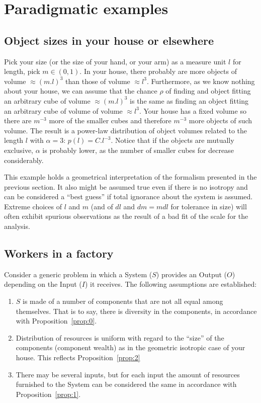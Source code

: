 \documentclass[a4paper, 11pt]{article} %
\begin{document}
\section{Paradigmatic examples}\label{sec:par}
\subsection{Object sizes in your house or elsewhere}\label{sec:siz}
Pick your size (or the size of your hand, or your arm)
as a measure unit $l$ for length, pick $m \in (0,1)$.
In your house, there probably are more objects
of volume $\approx (m.l)^3$ 
than those of volume $\approx l^3$.
Furthermore, as we know nothing about your house,
we can assume that the chance $\rho$ of finding and object
fitting an arbitrary cube of volume $\approx (m.l)^3$
is the same as finding an object fitting an
arbitrary cube of volume of volume $\approx l^3$.
Your house has a fixed volume so there are $m^{-3}$ more of
the smaller cubes and therefore $m^{-3}$ more objects of such
volume. 
The result is a power-law distribution of object volumes
related to the length $l$ with $\alpha=3$:
$p(l)=C.l^{-3}$.
Notice that if the objects are mutually exclusive,
$\alpha$ is probably lower, as the number of smaller
cubes for decrease considerably.

This example holds a geometrical
interpretation of the formalism presented in the previous section.
It also might be assumed true even if there is no isotropy
and can be considered a ``best guess'' if total ignorance
about the system is assumed. 
Extreme choices of $l$ and $m$ (and of $dl$ and $dm=mdl$ for tolerance in size)
will often exhibit spurious observations
as the result of a bad fit of the scale for the analysis.

\subsection{Workers in a factory}
Consider a generic problem in which a System ($S$) provides an Output ($O$) depending on the Input ($I$) it receives.
The following assumptions are established:
\begin{enumerate}
	\item $S$ is made of a number of components that are not all equal among themselves.
That is to say, there is diversity in the components, in accordance with Proposition~\ref{prop:0}. 
\item Distribution of resources is uniform with regard to the ``size'' of the components (component wealth) as in the geometric isotropic case of your house.
This reflects Proposition~\ref{prop:2}
\item There may be several inputs, but for each input the amount of resources furnished to the System can be considered the same 
	in accordance with Proposition~\ref{prop:1}.
\end{enumerate}
\end{document}
